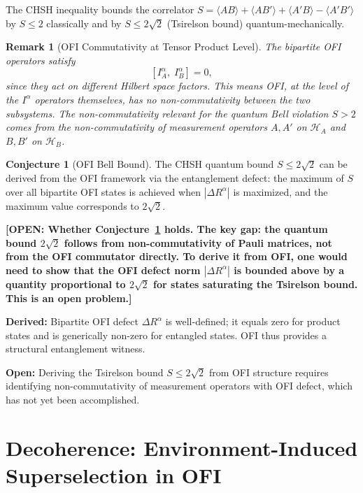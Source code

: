 \documentclass[12pt]{article}
\newtheorem{remark}[theorem]{Remark}
\theoremstyle{definition}
\newtheorem{conjecture}[theorem]{Conjecture}
\newcommand{\expect}[1]{\langle #1 \rangle}
\newcommand{\OPEN}[1]{\textcolor{opencolor}{\textbf{[OPEN: #1]}}}
\begin{document}
The CHSH inequality bounds the correlator
$S = \expect{AB} + \expect{AB'} + \expect{A'B} - \expect{A'B'}$
by $S \leq 2$ classically and by $S \leq 2\sqrt{2}$ (Tsirelson bound)
quantum-mechanically.

\begin{remark}[OFI Commutativity at Tensor Product Level]
The bipartite OFI operators satisfy
\[
  [I^\alpha_A,\; I^\alpha_B] = 0,
\]
since they act on different Hilbert space factors.  This means OFI,
at the level of the $I^\alpha$ operators themselves, has no
non-commutativity between the two subsystems.  The non-commutativity
relevant for the quantum Bell violation $S > 2$ comes from the
non-commutativity of \emph{measurement operators} $A, A'$ on
$\mathcal{H}_A$ and $B, B'$ on $\mathcal{H}_B$.
\end{remark}

\begin{conjecture}[OFI Bell Bound]
\label{conj:bell}
The CHSH quantum bound $S \leq 2\sqrt{2}$ can be derived from the
OFI framework via the entanglement defect: the maximum of $S$ over
all bipartite OFI states is achieved when $|\Delta R^\alpha|$ is
maximized, and the maximum value corresponds to $2\sqrt{2}$.
\end{conjecture}

\OPEN{Whether Conjecture~\ref{conj:bell} holds.  The key gap:
the quantum bound $2\sqrt{2}$ follows from non-commutativity of
Pauli matrices, not from the OFI commutator directly.  To derive
it from OFI, one would need to show that the OFI defect norm
$|\Delta R^\alpha|$ is bounded above by a quantity proportional
to $2\sqrt{2}$ for states saturating the Tsirelson bound.
This is an open problem.}

\begin{tcolorbox}[resultbox, title={Summary of Section~\ref{sec:entanglement}}]
\textbf{Derived:}
Bipartite OFI defect $\Delta R^\alpha$ is well-defined; it equals
zero for product states and is generically non-zero for entangled states.
OFI thus provides a structural entanglement witness.

\textbf{Open:}
Deriving the Tsirelson bound $S \leq 2\sqrt{2}$ from OFI structure
requires identifying non-commutativity of measurement operators with
OFI defect, which has not yet been accomplished.
\end{tcolorbox}

\section{Decoherence: Environment-Induced Superselection in OFI}
\label{sec:decoherence}
\end{document}
